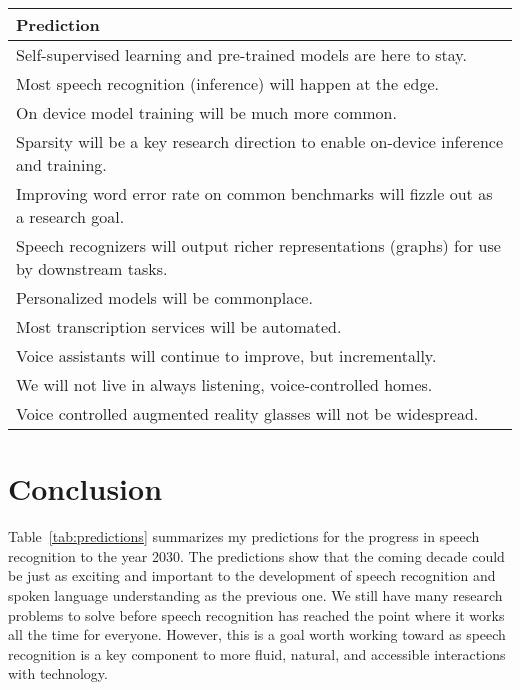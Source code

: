 \begin{table*}[ht!]
    \caption{Predictions for the progress in speech recognition research and applications
    by the year 2030.}
    \centering
    \begin{tabular}{l}
    \toprule
    Prediction \\
    \midrule
    Self-supervised learning and pre-trained models are here to stay. \\
    \rowcolor{Gray} Most speech recognition (inference) will happen at the edge. \\
    On device model training will be much more common. \\
    \rowcolor{Gray} Sparsity will be a key research direction to enable on-device inference and training. \\
    Improving word error rate on common benchmarks will fizzle out as a research goal. \\
    \rowcolor{Gray} Speech recognizers will output richer representations (graphs) for use by downstream tasks. \\
    Personalized models will be commonplace. \\
    \rowcolor{Gray} Most transcription services will be automated. \\
    Voice assistants will continue to improve, but incrementally. \\
    \rowcolor{Gray} We will not live in always listening, voice-controlled homes. \\
    Voice controlled augmented reality glasses will not be widespread. \\
    \bottomrule
    \end{tabular}
    \label{tab:predictions}
\end{table*}

\section{Conclusion}
\label{sec:conclusion}

Table~\ref{tab:predictions} summarizes my predictions for the progress in
speech recognition to the year 2030. The predictions show that the coming
decade could be just as exciting and important to the development of speech
recognition and spoken language understanding as the previous one. We still
have many research problems to solve before speech recognition has reached the
point where it works all the time for everyone. However, this is a goal worth
working toward as speech recognition is a key component to more fluid,
natural, and accessible interactions with technology.
